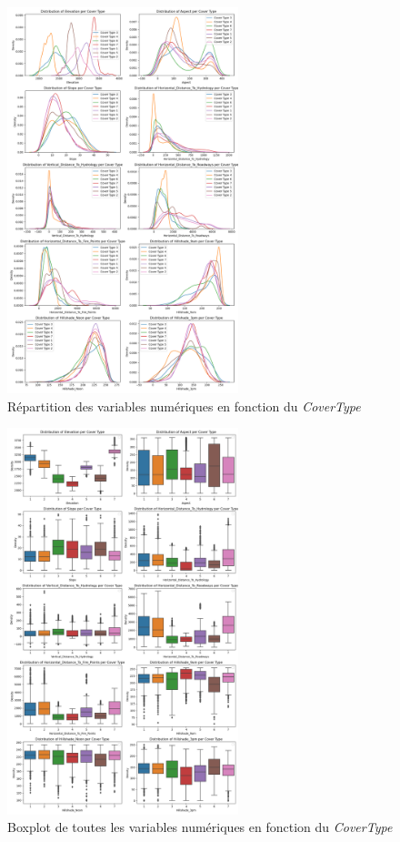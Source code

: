 \documentclass{article}
\begin{document}
\newpage
\begin{figure}[h]
  \centering
  \includegraphics[width=0.6\textwidth]{numerical_variables_distribution.png}
    \caption{Répartition des variables numériques en fonction du \textit{CoverType}}
  \label{fig:varnumparcovertype}
\end{figure}
\newpage
\begin{figure}[h]
  \centering
  \includegraphics[width=0.6\textwidth]{numerical_variables_boxplot.png}
    \caption{Boxplot de toutes les variables numériques en fonction du \textit{CoverType}}
  \label{fig:boxplot_numerique}
\end{figure}
\newpage
\end{document}
